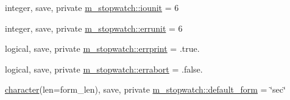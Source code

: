 \begin{DoxyCompactItemize}
\item 
integer, save, private \hyperlink{namespacem__stopwatch_a3f5d3edd3b740437b0e59f64bc956402}{m\+\_\+stopwatch\+::iounit} = 6
\item 
integer, save, private \hyperlink{namespacem__stopwatch_a1a56c421f8dda3ea8ff78ee49d1d4e11}{m\+\_\+stopwatch\+::errunit} = 6
\item 
logical, save, private \hyperlink{namespacem__stopwatch_a8092ca2d20b2b127a24fb4cb906b96be}{m\+\_\+stopwatch\+::errprint} = .true.
\item 
logical, save, private \hyperlink{namespacem__stopwatch_ab704edc792bb62b6966e6d390be99a65}{m\+\_\+stopwatch\+::errabort} = .false.
\item 
\hyperlink{option__stopwatch_83_8txt_abd4b21fbbd175834027b5224bfe97e66}{character}(len=form\+\_\+len), save, private \hyperlink{namespacem__stopwatch_a8bd2994267296dcfb8d6ca82c30e0db3}{m\+\_\+stopwatch\+::default\+\_\+form} = \char`\"{}sec\char`\"{}
\end{DoxyCompactItemize}
